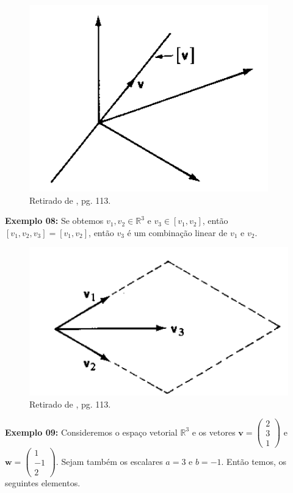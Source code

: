 \begin{figure}[H]
	\centering
	\includegraphics[scale=0.90]{cb_exemplo7.png}
	\caption{Retirado de \cite{boldrini1980}, pg. 113.}
\end{figure}

\noindent\textbf{Exemplo 08:} Se obtemos $v_1, v_2 \in \mathbb{R}^3$ e $v_3 \in [v_1, v_2]$, então $[v_1, v_2, v_3] = [v_1, v_2]$, então $v_3$ é um combinação linear de  $v_1$ e $v_2$.

\begin{figure}[H]
	\centering
	\includegraphics[scale=0.90]{cb_exemplo8.png}
	\caption{Retirado de \cite{boldrini1980}, pg. 113.}
\end{figure}

\noindent\textbf{Exemplo 09:} Consideremos o espaço vetorial $\mathbb{R}^3$ e os vetores $\mathbf{v} = \begin{pmatrix} 2 \\ 3 \\ 1 \end{pmatrix}$ e $\mathbf{w} = \begin{pmatrix} 1 \\ -1 \\ 2 \end{pmatrix}$. Sejam também os escalares $a = 3$ e $b = -1$. Então temos, os seguintes elementos.


